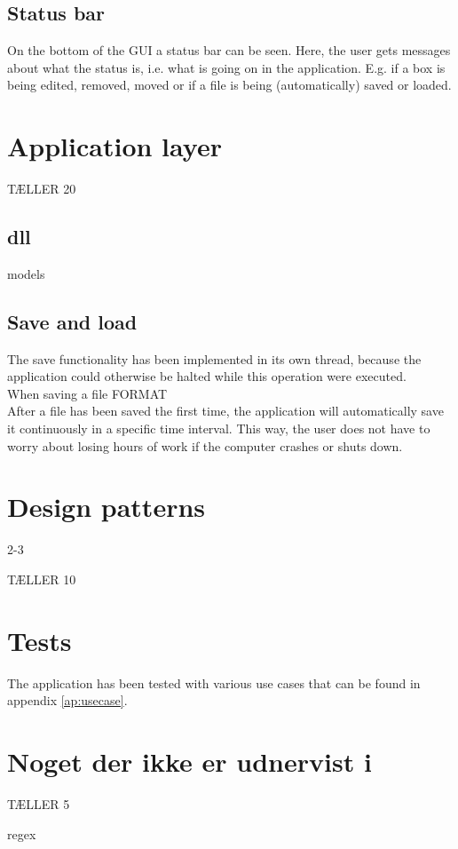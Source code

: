 \subsection{Status bar}

On the bottom of the GUI a status bar can be seen. Here, the user gets messages about what the status is, i.e. what is going on in the application. E.g. if a box is being edited, removed, moved or if a file is being (automatically) saved or loaded.

\section{Application layer}
\label{sec:app_layer}

TÆLLER 20

\subsection{dll}

models

\subsection{Save and load}

The save functionality has been implemented in its own thread, because the application could otherwise be halted while this operation were executed.\\

When saving a file FORMAT\\

After a file has been saved the first time, the application will automatically save it continuously in a specific time interval. This way, the user does not have to worry about losing hours of work if the computer crashes or shuts down.

\section{Design patterns}
\label{sec:design_pattern}

2-3

TÆLLER 10


\section{Tests}
\label{sec:tests}

The application has been tested with various use cases that can be found in appendix \ref{ap:usecase}.

\section{Noget der ikke er udnervist i}

TÆLLER 5

regex